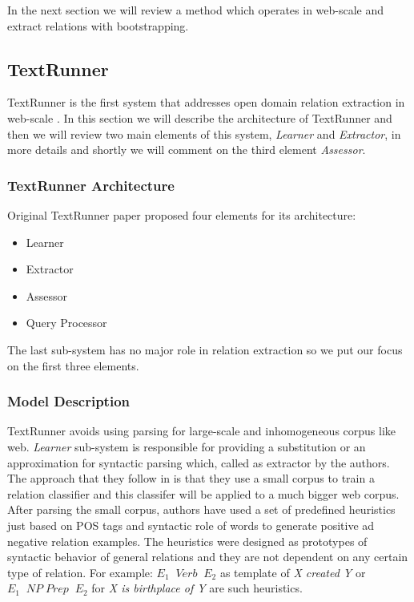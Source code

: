 In the next section we will review a method which operates in web-scale and extract relations with bootstrapping.




\subsection{TextRunner}
\label{ssec:textrunner}

TextRunner is the first system that addresses open domain relation extraction in web-scale \cite{Yates2007}. In this section
 we will describe the architecture of TextRunner and then we will review two main elements of this system, \emph{Learner} and
  \emph{Extractor}, in more details and shortly we will comment on the third element \emph{Assessor}.
 
\subsubsection{TextRunner Architecture}
\label{ssec:textrunner-arch}

Original TextRunner paper proposed four elements for its architecture:
\begin{itemize}
  \item Learner
  \item Extractor
  \item Assessor
  \item Query Processor
\end{itemize}

The last sub-system has no major role in relation extraction so we put our focus on the first three elements.

\subsubsection{Model Description}
\label{ssec:model-dscrb}

TextRunner avoids using parsing for large-scale and inhomogeneous corpus like web. \emph{Learner} sub-system is responsible
 for providing a substitution or an approximation for syntactic parsing which, called as extractor by the authors.
  The approach that they follow in \cite{Yates2007}
  is that they use a small corpus to train a  relation classifier and this classifer will be applied to a much bigger web corpus.
   After parsing the small corpus, authors have used a set of predefined heuristics just based on POS tags and syntactic role 
   of words to generate positive ad negative relation examples. The heuristics were designed as prototypes of syntactic behavior
   of general relations and they are not dependent on any certain type of relation. 
   For example:   $E_1 \;\; Verb \;\; E_2$ as template of \emph{X created Y} or 
   $ E_1 \; \; NP \;  Prep \; \; E_2$ for \emph{X is birthplace of Y} are such heuristics.\\
   
